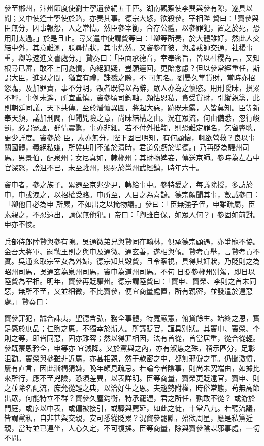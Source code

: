 \begin{pinyinscope}
 參至郴州，汴州節度使劉士寧遺參絹五千匹。湖南觀察使李巽與參有隙，遂具以聞；又中使逢士寧使於路，亦奏其事。德宗大怒，欲殺參。宰相陛
 贄曰：「竇參與臣無分，因事報怨，人之常情。然臣參宰衡，合存公體，以參罪犯，置之於死，恐用刑太過。」於是且止。尋又遣中使謂贄等曰：「卿等所奏，於大體雖好，然此人交結中外，其意難測，朕尋情狀，其事灼然。又竇參在彼，與諸戎帥交通，社稷事重，卿等速進文書處分。」贄奏曰：「臣面承德音，幸奉密旨，皆以社稷為言，又知根尋已審，敢不上同憂憤，內絕狐疑，豈願遲回，更貽念慮？但以參常經重任，斯謂大臣，進退之間，猶宜有禮，誅戮之際，不
 可無名。劉晏久掌貨財，當時亦招怨讟，及加罪責，事不分明，叛者既得以為辭，眾人亦為之懷愍。用刑曖昧，損累不輕，事例未遙，所宜重慎。竇參頃司鈞軸，頗怙恩私，貪受貨財，引縱親黨，此則朝廷同議，天下共傳。至於潛懷異圖，將起大惡，跡既未露，人皆莫知。臣等新奉天顏，議加刑闢，但聞兇險之意，尚昧結構之由。況在眾流，何由備悉，忽行峻罰，必謂冤誣，群情震驚，事亦非細。若不付外推鞫，則恐難定罪名，乞留睿聰，更少詳度。竇參於
 臣，素亦無分，陛下固已明知，有何顧懷，輒欲營救？良以事關國體，義絕私嫌，所冀典刑不濫於清時，君道免虧於聖德。」乃再貶為驩州司馬。男景伯，配泉州；女尼真如，隸郴州；其財物婢妾，傳送京師。參時為左右中官深怒，謗沮不已，未至驩州，賜死於邕州武經鎮，時年六十。



 竇申者，參之族子。累遷至京兆少尹，轉給事中。參特愛之，每議除授，多訪於申，申或洩之，以招權受賂。申所至，人目之為喜鵲。德宗頗聞其事，數誡參曰：「卿他日必為申
 所累，不如出之以掩物議。」參曰：「臣無強子侄，申雖疏屬，臣素親之，不忍遠出，請保無他犯。」帝曰：「卿雖自保，如眾人何？」參固如前對。申亦不悛。



 兵部侍郎陸贄與參有隙。吳通微弟兄與贄同在翰林，俱承德宗顧遇，亦爭寵不協。金吾大將軍、嗣虢王則之與申及通微、通玄善，遂相與傾。贄考貢舉，言贄考貢不實。吳通玄取宗室女為外婦，德宗知其毀贄，且令察視，具得其奸狀，乃貶則之為昭州司馬，吳通玄為泉州司馬，竇申為道州司馬。不旬
 日貶參郴州別駕，即日以陸贄為宰相。明年，竇參再貶驩州。德宗謂陸贄曰：「竇申、竇榮、李則之首末同惡，無所不至，又並細微，不比竇參，便宜商量處置，所有親密，並發遣於遠惡處。」贄奏曰：



 竇參罪犯，誠合誅夷，聖德含弘，務全事體，特寬嚴憲，俯貸餘生。始終之恩，實足感於庶品；仁煦之惠，不獨幸於斯人。所議貶官，謹具別狀。其竇申、竇榮、李則之等，即皆同惡，固亦難容；然以得罪相因，法有首從，首當居重，從合從輕。參既蒙恩矜全，申等亦
 宜減降。又於黨與之內，亦有淑慝之殊，稍示區分，足彰沮勸。竇榮與參雖非近屬，亦甚相親，然于款密之中，都無邪僻之事。仍聞激憤，屢有直言，因此漸構猜嫌，晚年頗見疏忌。若論今者陰事，則尚未究端由，如據比來所行，應不至兇險，恐須差異，以表詳明。臣等商量，竇榮更貶遠官，竇申、則之並除名配流，庶允從輕之典，以洽好生之恩。夫趨勢附權，時俗常態，茍無高節出眾，何能特立不群？竇參久塵鈞衡，特承寵渥，君之所任，孰敢不從？
 或游於門庭，或序以中表，或偏被接引，或驟與薦延，如此之徒，十常八九。若聽流議，皆謂黨私，自非甚與交親，安可悉從貶累？況竇參罷黜，殆欲周星，應是私黨近親，當時並已連坐，人心久定，不可復搖。臣等商量，除與竇參陰謀邪事處，一切不問。




\end{pinyinscope}
